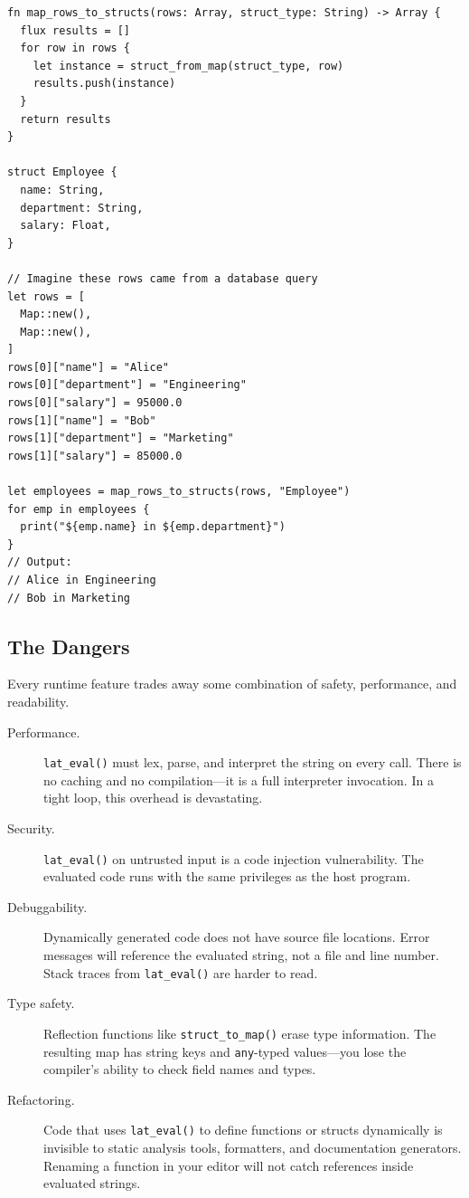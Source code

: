 \begin{lstlisting}[language=Lattice, caption={A generic ORM-style mapper}]
fn map_rows_to_structs(rows: Array, struct_type: String) -> Array {
  flux results = []
  for row in rows {
    let instance = struct_from_map(struct_type, row)
    results.push(instance)
  }
  return results
}

struct Employee {
  name: String,
  department: String,
  salary: Float,
}

// Imagine these rows came from a database query
let rows = [
  Map::new(),
  Map::new(),
]
rows[0]["name"] = "Alice"
rows[0]["department"] = "Engineering"
rows[0]["salary"] = 95000.0
rows[1]["name"] = "Bob"
rows[1]["department"] = "Marketing"
rows[1]["salary"] = 85000.0

let employees = map_rows_to_structs(rows, "Employee")
for emp in employees {
  print("${emp.name} in ${emp.department}")
}
// Output:
// Alice in Engineering
// Bob in Marketing
\end{lstlisting}

\subsection{The Dangers}

Every runtime feature trades away some combination of safety, performance, and readability.

\begin{description}
  \item[Performance.] \lstinline|lat_eval()| must lex, parse, and interpret the string on every call.
    There is no caching and no compilation---it is a full interpreter invocation.
    In a tight loop, this overhead is devastating.

  \item[Security.] \lstinline|lat_eval()| on untrusted input is a code injection vulnerability.
    The evaluated code runs with the same privileges as the host program.

  \item[Debuggability.] Dynamically generated code does not have source file locations.
    Error messages will reference the evaluated string, not a file and line number.
    Stack traces from \lstinline|lat_eval()| are harder to read.

  \item[Type safety.] Reflection functions like \lstinline|struct_to_map()| erase type information.
    The resulting map has string keys and \lstinline|any|-typed values---you lose the compiler's ability
    to check field names and types.

  \item[Refactoring.] Code that uses \lstinline|lat_eval()| to define functions or structs dynamically
    is invisible to static analysis tools, formatters, and documentation generators.
    Renaming a function in your editor will not catch references inside evaluated strings.
\end{description}

